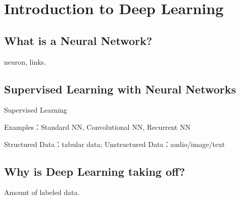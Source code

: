 \section{Introduction to Deep Learning}


\subsection{What is a Neural Network?}
neuron, links.


\subsection{Supervised Learning with Neural Networks}
Supervised Learning

Examples：Standard NN, Convolutional NN, Recurrent NN

Structured Data：tabular data; Unstructured Data：audio/image/text


\subsection{Why is Deep Learning taking off?}
Amount of labeled data.